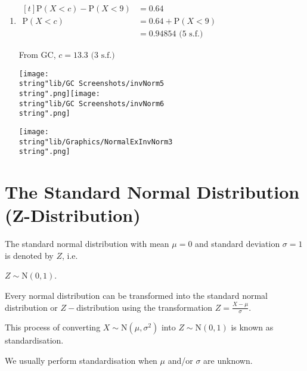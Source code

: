 \documentclass[11pt,a4paper]{book}
\begin{document}
\begin{example}
\begin{enumerate}[label=(\alph*)]
\begin{minipage}[t]{.3\textwidth}
\end{minipage}

\item
$
\begin{aligned}[t]
\text{P}\left(X<c\right)-\text{P}\left(X<9\right) & =0.64\\
\text{P}\left(X<c\right) & =0.64+\text{P}\left(X<9\right)\\
 & =0.94854\text{ (5 s.f.)}
\end{aligned}
$

\begin{minipage}[t]{.6\textwidth}

From GC, $c=13.3\text{ (3 s.f.)}$

\texttt{[image: \\string"lib/GC Screenshots/invNorm5\\string".png]}\hspace{1cm}\texttt{[image: \\string"lib/GC Screenshots/invNorm6\\string".png]}

\end{minipage}
\begin{minipage}[t]{.3\textwidth}
\begin{center}
\texttt{[image: \\string"lib/Graphics/NormalExInvNorm3\\string".png]}
\par\end{center}

\end{minipage}

\end{enumerate}

\end{example}

\newpage

\section{The Standard Normal Distribution (Z-Distribution)}

The standard normal distribution with mean $\mu=0$ and standard deviation $\sigma=1$ is denoted by $Z$, i.e.

$Z\sim\text{N}\left(0,1\right)$.

Every normal distribution can be transformed into the standard normal
distribution or $Z-$distribution using the transformation ${\displaystyle Z=\frac{X-\mu}{\sigma}}$.

This process of converting $X\sim\text{N}\left(\mu,\sigma^{2}\right)$
into $Z\sim\text{N}\left(0,1\right)$ is known as standardisation.

We usually perform standardisation when $\mu$ and/or $\sigma$ are
unknown.
\end{document}
